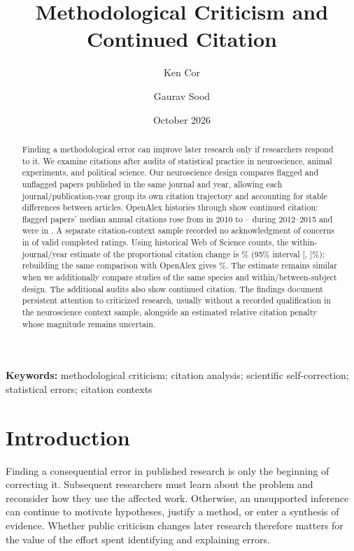 \documentclass[11pt,letterpaper]{article}
\title{Methodological Criticism and Continued Citation}
\author{Ken Cor \and Gaurav Sood}
\date{October 2026}
\begin{document}
\maketitle
\begin{abstract}
\noindent Finding a methodological error can improve later research only if researchers respond to it. We examine citations after audits of statistical practice in neuroscience, animal experiments, and political science. Our neuroscience design compares flagged and unflagged papers published in the same journal and year, allowing each journal/publication-year group its own citation trajectory and accounting for stable differences between articles. OpenAlex histories through \NwPathsLastYear{} show continued citation: flagged papers' median annual citations rose from \NwPathsMedianBefore{} in 2010 to \NwPathsMedianMin--\NwPathsMedianMax{} during 2012--2015 and were \NwPathsMedianLast{} in \NwPathsLastYear{}. A separate citation-context sample recorded no acknowledgment of concerns in \Nonack{} of \Rated{} valid completed ratings. Using historical Web of Science counts, the within-journal/year estimate of the proportional citation change is \JcWosPercent\% (95\% interval [\JcWosLower, \JcWosUpper]\%); rebuilding the same comparison with OpenAlex gives \JcOaPercent\%. The estimate remains similar when we additionally compare studies of the same species and within/between-subject design. The additional audits also show continued citation. The findings document persistent attention to criticized research, usually without a recorded qualification in the neuroscience context sample, alongside an estimated relative citation penalty whose magnitude remains uncertain.
\end{abstract}
\vspace{1em}
\noindent\textbf{Keywords:} methodological criticism; citation analysis; scientific self-correction; statistical errors; citation contexts

\newpage
\section{Introduction}
Finding a consequential error in published research is only the beginning of correcting it. Subsequent researchers must learn about the problem and reconsider how they use the affected work. Otherwise, an unsupported inference can continue to motivate hypotheses, justify a method, or enter a synthesis of evidence. Whether public criticism changes later research therefore matters for the value of the effort spent identifying and explaining errors.
\end{document}
